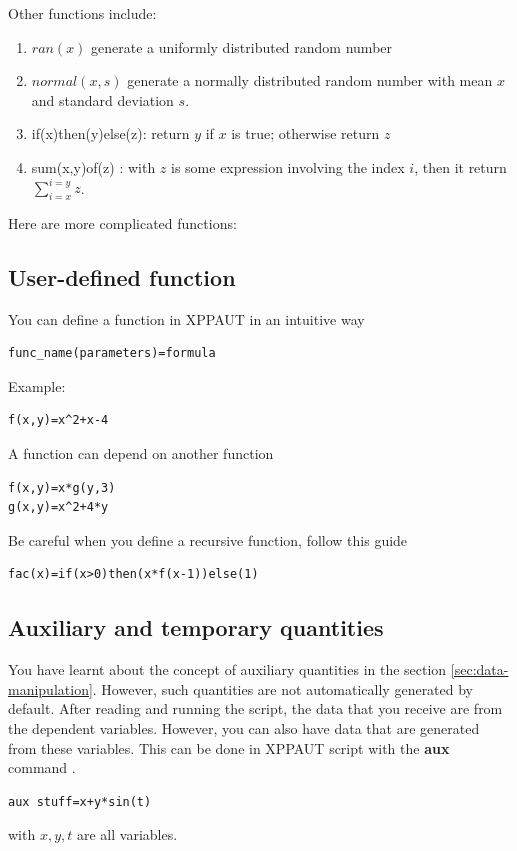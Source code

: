 Other functions include:
\begin{enumerate}
\item $ran(x)$ generate a uniformly distributed random number

\item $normal(x,s)$ generate a normally distributed random number with
  mean $x$ and standard deviation $s$.

\item if(x)then(y)else(z): return $y$ if $x$ is true; otherwise return
  $z$

\item sum(x,y)of(z) : with $z$ is some expression involving the index
  $i$, then it return $\sum_{i=x}^{i=y}z$.
\end{enumerate}

Here are more complicated functions:


\subsection{User-defined function}
\label{sec:user-defin-funct}

You can define a function in XPPAUT in an intuitive way
\begin{lstlisting}
func_name(parameters)=formula
\end{lstlisting}
Example:
\begin{lstlisting}
f(x,y)=x^2+x-4
\end{lstlisting}

A function can depend on another function
\begin{lstlisting}
f(x,y)=x*g(y,3)
g(x,y)=x^2+4*y
\end{lstlisting}

Be careful when you define a recursive function, follow this guide
\begin{lstlisting}
fac(x)=if(x>0)then(x*f(x-1))else(1)
\end{lstlisting}


\subsection{Auxiliary and temporary quantities}
\label{sec:auxil-temp-quant}

You have learnt about the concept of auxiliary quantities in the
section \ref{sec:data-manipulation}. However, such quantities are not
automatically generated by default. After reading and running the
script, the data that you receive are from the dependent
variables. However, you can also have data that are generated from
these variables. This can be done in XPPAUT script with the {\bf aux}
command
.
\begin{lstlisting}
aux stuff=x+y*sin(t)
\end{lstlisting}
with $x, y, t$ are all variables.

